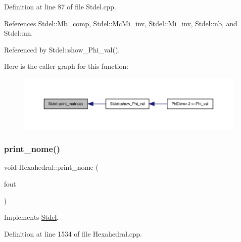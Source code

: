 Definition at line 87 of file Stdel.\+cpp.



References Stdel\+::\+Mb\+\_\+comp, Stdel\+::\+Mc\+Mi\+\_\+inv, Stdel\+::\+Mi\+\_\+inv, Stdel\+::nb, and Stdel\+::nn.



Referenced by Stdel\+::show\+\_\+\+Phi\+\_\+val().

Here is the caller graph for this function\+:
\nopagebreak
\begin{figure}[H]
\begin{center}
\leavevmode
\includegraphics[width=350pt]{classStdel_a319e6a16011b22e12028a841b7686f03_icgraph}
\end{center}
\end{figure}
\mbox{\label{classHexahedral_a53c693b47166842fd72c51750c68297d}} 
\subsubsection{\texorpdfstring{print\+\_\+nome()}{print\_nome()}}
{\footnotesize\ttfamily void Hexahedral\+::print\+\_\+nome (\begin{DoxyParamCaption}\item[{F\+I\+LE $\ast$}]{fout }\end{DoxyParamCaption})\hspace{0.3cm}{\ttfamily [virtual]}}



Implements \hyperlink{classStdel_ac654f45f744ec4cfeab74ed4ded99ef5}{Stdel}.



Definition at line 1534 of file Hexahedral.\+cpp.

\mbox{\label{classHexahedral_ae32d2d1e79c93e4346fcf0b4483ae218}} 
